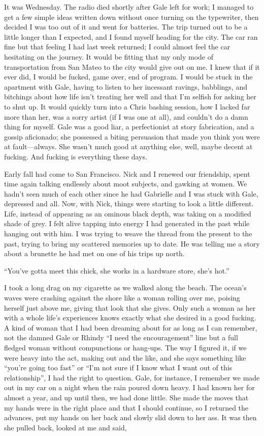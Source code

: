 It was Wednesday. The radio died shortly after Gale left for work; I
managed to get a few simple ideas written down without once turning on
the typewriter, then decided I was too out of it and went for batteries.
The trip turned out to be a little longer than I expected, and I found
myself heading for the city. The car ran fine but that feeling I had
last week returned; I could almost feel the car hesitating on the
journey. It would be fitting that my only mode of transportation from
San Mateo to the city would give out on me. I knew that if it ever did,
I would be fucked, game over, end of program. I would be stuck in the
apartment with Gale, having to listen to her incessant ravings,
babblings, and bitchings about how life isn't treating her well and that
I'm selfish for asking her to shut up. It would quickly turn into a
Chris bashing session, how I lacked far more than her, was a sorry
artist (if I was one at all), and couldn't do a damn thing for myself.
Gale was a good liar, a perfectionist at story fabrication, and a gossip
aficionado; she possessed a biting persuasion that made you think you
were at fault---always. She wasn't much good at anything else, well,
maybe decent at fucking. And fucking is everything these days.

Early fall had come to San Francisco. Nick and I renewed our friendship,
spent time again talking endlessly about moot subjects, and gawking at
women. We hadn't seen much of each other since he had Gabrielle and I
was stuck with Gale, depressed and all. Now, with Nick, things were
starting to look a little different. Life, instead of appearing as an
ominous black depth, was taking on a modified shade of grey. I felt
alive tapping into energy I had generated in the past while hanging out
with him. I was trying to weave the thread from the present to the past,
trying to bring my scattered memories up to date. He was telling me a
story about a brunette he had met on one of his trips up north.

``You've gotta meet this chick, she works in a hardware store, she's
hot.''

I took a long drag on my cigarette as we walked along the beach. The
ocean's waves were crashing against the shore like a woman rolling over
me, poising herself just above me, giving that look that she gives. Only
such a woman as her with a whole life's experiences knows exactly what
she desired in a good fucking. A kind of woman that I had been dreaming
about for as long as I can remember, not the damned Gale or Rhindy ``I
need the encouragement'' line but a full fledged woman without
compunctions or hang-ups. The way I figured it, if we were heavy into
the act, making out and the like, and she says something like ``you're
going too fast'' or ``I'm not sure if I know what I want out of this
relationship'', I had the right to question. Gale, for instance, I
remember we made out in my car on a night when the rain poured down
heavy. I had known her for almost a year, and up until then, we had done
little. She made the moves that my hands were in the right place and
that I should continue, so I returned the advances, put my hands on her
back and slowly slid down to her ass. It was then she pulled back,
looked at me and said,

